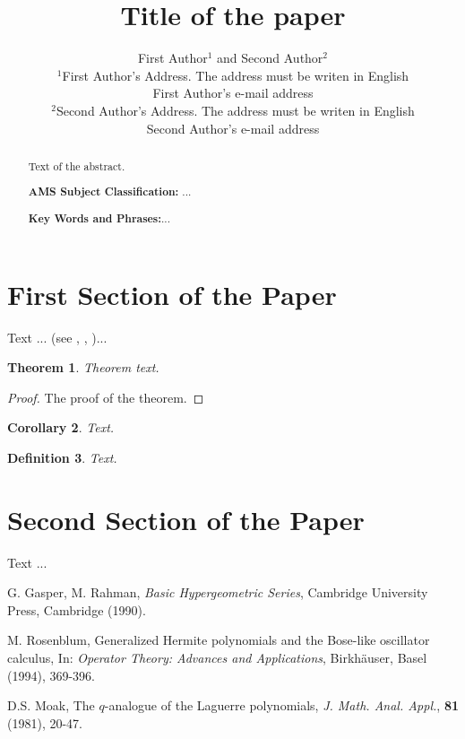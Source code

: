 \documentclass[12pt]{article}
\theoremstyle{theorem}
\newtheorem{theorem}{Theorem}
\newtheorem{corollary}[theorem]{Corollary}
\theoremstyle{defi}
\newtheorem{definition}[theorem]{Definition}
\begin{document}
\title{Title of the paper}

\author{First Author$^1$ and Second Author$^2$\\
$^1$First Author's Address. The address must be writen in English\\
First Author's e-mail address\\[2pt]
$^2$Second Author's Address. The address must be writen in English\\
Second Author's e-mail address}

\maketitle

\begin{abstract}
Text of the abstract.

{\bf AMS Subject Classification:} ...

{\bf Key Words and Phrases:}...
\end{abstract}



\section{First Section of the Paper}

Text ... (see \cite{gasrah}, \cite{rosbl}, \cite{Moak})...

\begin{theorem}
Theorem text.
\end{theorem}

\begin{proof}
The proof of the theorem.
\end{proof}

\begin{corollary}
Text.
\end{corollary}

\begin{definition}
Text.
\end{definition}

\section{Second Section of the Paper}

Text ...

\begin{thebibliography}{99}

 G. Gasper, M. Rahman, {\it Basic Hypergeometric Series}, Cambridge University Press, Cambridge (1990).

 M. Rosenblum, Generalized Hermite polynomials and the Bose-like oscillator calculus, In: {\it Operator Theory: Advances and Applications}, Birkh\"auser, Basel (1994), 369-396.

 D.S. Moak, The $q$-analogue of the Laguerre polynomials, {\it J. Math. Anal. Appl.}, {\bf 81} (1981), 20-47.

\end{thebibliography}
\end{document}
